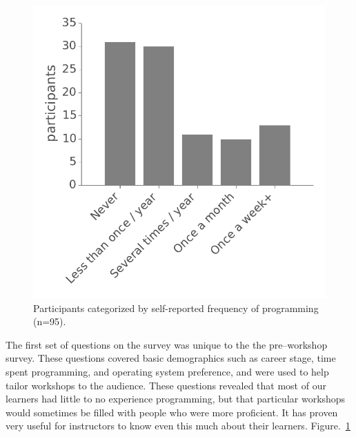 \documentclass[10pt, twocolumn]{article}
\begin{document}
	\begin{figure}[!b]
		\includegraphics[width=\linewidth]{figures/ProgrammingFrequency}
		\caption{
		    Participants categorized by self-reported frequency of programming (n=95).
	    }
		\label{frequency}
	\end{figure}
	The first set of questions on the survey was unique to the the pre--workshop survey.
	These questions covered basic demographics such as career stage,
	time spent programming,
	and operating system preference,
	and were used to help tailor workshops to the audience.
	These questions revealed that most of our learners had little to no experience programming,
	but that particular workshops would sometimes be filled with people who were more proficient.
	It has proven very useful for instructors to know even this much about their learners. Figure.~\ref{frequency}
	
\end{document}
